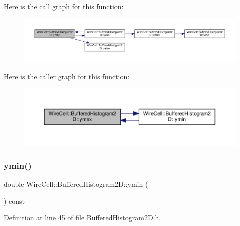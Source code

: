 Here is the call graph for this function\+:
\nopagebreak
\begin{figure}[H]
\begin{center}
\leavevmode
\includegraphics[width=350pt]{class_wire_cell_1_1_buffered_histogram2_d_af0286addd8f7124fa4def025db6038d4_cgraph}
\end{center}
\end{figure}
Here is the caller graph for this function\+:
\nopagebreak
\begin{figure}[H]
\begin{center}
\leavevmode
\includegraphics[width=350pt]{class_wire_cell_1_1_buffered_histogram2_d_af0286addd8f7124fa4def025db6038d4_icgraph}
\end{center}
\end{figure}
\mbox{\label{class_wire_cell_1_1_buffered_histogram2_d_a772cc0d25c6cf84beb629960d5e3e440}} 
\subsubsection{\texorpdfstring{ymin()}{ymin()}}
{\footnotesize\ttfamily double Wire\+Cell\+::\+Buffered\+Histogram2\+D\+::ymin (\begin{DoxyParamCaption}{ }\end{DoxyParamCaption}) const\hspace{0.3cm}{\ttfamily [inline]}}



Definition at line 45 of file Buffered\+Histogram2\+D.\+h.

